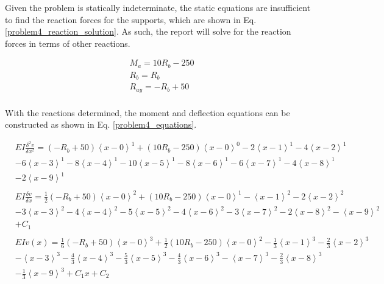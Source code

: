 \documentclass[a4paper]{article}
\begin{document}
Given the problem is statically indeterminate, the static equations are insufficient to find the reaction forces for the supports, which are shown in Eq. \ref{problem4_reaction_solution}. As such, the report will solve for the reaction forces in terms of other reactions.

\begin{equation}
\begin{split}
	& M_a = 10R_b - 250 \\
	& R_{b} = R_b \\
	& R_{ay} = -R_b + 50 \\
\end{split}
\label{problem4_reaction_solution}
\end{equation}

With the reactions determined, the moment and deflection equations can be constructed as shown in Eq. \ref{problem4_equations}.

\begin{equation}
    \begin{split}
& EI \frac{\delta^2 v}{\delta x^2} = \left(-R_b + 50\right)\left<x-0\right>^1 + \left(10R_b - 250\right)\left<x-0\right>^0 - 2\left<x-1\right>^1 - 4\left<x-2\right>^1\\
& - 6\left<x-3\right>^1   - 8\left<x-4\right>^1 - 10\left<x-5\right>^1 -  8\left<x-6\right>^1 - 6\left<x-7\right>^1  -  4\left<x-8\right>^1\\
&  - 2\left<x-9\right>^1  \\
& \\
& EI \frac{\delta v}{\delta x} = \frac{1}{2}\left(-R_b + 50\right)\left<x-0\right>^2 + \left(10R_b - 250\right)\left<x-0\right>^1 - \left<x-1\right>^2 - 2\left<x-2\right>^2  \\
& - 3\left<x-3\right>^2 - 4\left<x-4\right>^2 - 5\left<x-5\right>^2 -  4\left<x-6\right>^2 - 3\left<x-7\right>^2 -  2\left<x-8\right>^2 - \left<x-9\right>^2 \\
& + C_1 \\
& \\
& EI v(x) = \frac{1}{6}\left(-R_b + 50\right)\left<x-0\right>^3 + \frac{1}{2}\left(10R_b - 250\right)\left<x-0\right>^2 - \frac{1}{3}\left<x-1\right>^3 - \frac{2}{3}\left<x-2\right>^3 \\
& - \left<x-3\right>^3 - \frac{4}{3}\left<x-4\right>^3 - \frac{5}{3}\left<x-5\right>^3  -  \frac{4}{3}\left<x-6\right>^3 - \left<x-7\right>^3 -  \frac{2}{3}\left<x-8\right>^3  \\
& - \frac{1}{3}\left<x-9\right>^3  + C_1 x + C_2 \\
    \end{split}
\label{problem4_equations}
\end{equation}
\end{document}
